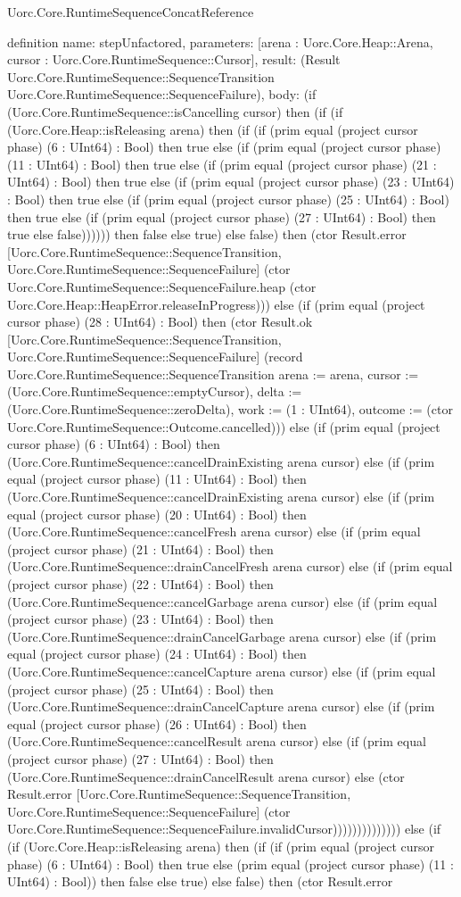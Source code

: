 \begin{lexlean}{Uorc.Core.RuntimeSequenceConcatReference}
\begin{semanticmodule}
definition{
  name: stepUnfactored,
  parameters: [arena : Uorc.Core.Heap::Arena, cursor : Uorc.Core.RuntimeSequence::Cursor],
  result: (Result Uorc.Core.RuntimeSequence::SequenceTransition Uorc.Core.RuntimeSequence::SequenceFailure),
  body: (if (Uorc.Core.RuntimeSequence::isCancelling cursor) then (if (if (Uorc.Core.Heap::isReleasing arena) then (if (if (prim equal (project cursor phase) (6 : UInt64) : Bool) then true else (if (prim equal (project cursor phase) (11 : UInt64) : Bool) then true else (if (prim equal (project cursor phase) (21 : UInt64) : Bool) then true else (if (prim equal (project cursor phase) (23 : UInt64) : Bool) then true else (if (prim equal (project cursor phase) (25 : UInt64) : Bool) then true else (if (prim equal (project cursor phase) (27 : UInt64) : Bool) then true else false)))))) then false else true) else false) then (ctor Result.error [Uorc.Core.RuntimeSequence::SequenceTransition, Uorc.Core.RuntimeSequence::SequenceFailure] (ctor Uorc.Core.RuntimeSequence::SequenceFailure.heap (ctor Uorc.Core.Heap::HeapError.releaseInProgress))) else (if (prim equal (project cursor phase) (28 : UInt64) : Bool) then (ctor Result.ok [Uorc.Core.RuntimeSequence::SequenceTransition, Uorc.Core.RuntimeSequence::SequenceFailure] (record Uorc.Core.RuntimeSequence::SequenceTransition {arena := arena, cursor := (Uorc.Core.RuntimeSequence::emptyCursor), delta := (Uorc.Core.RuntimeSequence::zeroDelta), work := (1 : UInt64), outcome := (ctor Uorc.Core.RuntimeSequence::Outcome.cancelled)})) else (if (prim equal (project cursor phase) (6 : UInt64) : Bool) then (Uorc.Core.RuntimeSequence::cancelDrainExisting arena cursor) else (if (prim equal (project cursor phase) (11 : UInt64) : Bool) then (Uorc.Core.RuntimeSequence::cancelDrainExisting arena cursor) else (if (prim equal (project cursor phase) (20 : UInt64) : Bool) then (Uorc.Core.RuntimeSequence::cancelFresh arena cursor) else (if (prim equal (project cursor phase) (21 : UInt64) : Bool) then (Uorc.Core.RuntimeSequence::drainCancelFresh arena cursor) else (if (prim equal (project cursor phase) (22 : UInt64) : Bool) then (Uorc.Core.RuntimeSequence::cancelGarbage arena cursor) else (if (prim equal (project cursor phase) (23 : UInt64) : Bool) then (Uorc.Core.RuntimeSequence::drainCancelGarbage arena cursor) else (if (prim equal (project cursor phase) (24 : UInt64) : Bool) then (Uorc.Core.RuntimeSequence::cancelCapture arena cursor) else (if (prim equal (project cursor phase) (25 : UInt64) : Bool) then (Uorc.Core.RuntimeSequence::drainCancelCapture arena cursor) else (if (prim equal (project cursor phase) (26 : UInt64) : Bool) then (Uorc.Core.RuntimeSequence::cancelResult arena cursor) else (if (prim equal (project cursor phase) (27 : UInt64) : Bool) then (Uorc.Core.RuntimeSequence::drainCancelResult arena cursor) else (ctor Result.error [Uorc.Core.RuntimeSequence::SequenceTransition, Uorc.Core.RuntimeSequence::SequenceFailure] (ctor Uorc.Core.RuntimeSequence::SequenceFailure.invalidCursor)))))))))))))) else (if (if (Uorc.Core.Heap::isReleasing arena) then (if (if (prim equal (project cursor phase) (6 : UInt64) : Bool) then true else (prim equal (project cursor phase) (11 : UInt64) : Bool)) then false else true) else false) then (ctor Result.error }
\end{semanticmodule}
\end{lexlean}
